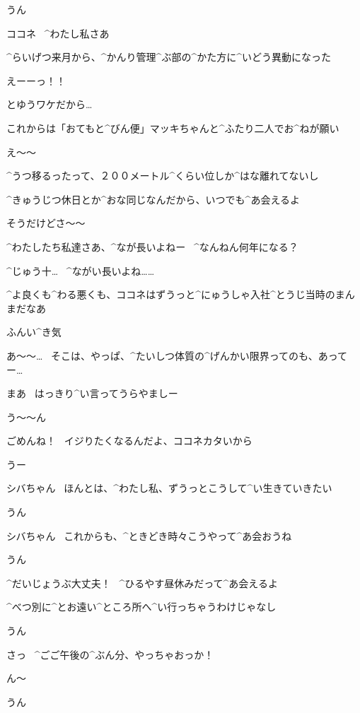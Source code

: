\Kokone うん

\page[79]
\Shiba ココネ
\ ^{わたし}{私}さあ

\Shiba ^{らいげつ}{来月}から、^{かんり}{管理}^{ぶ}{部}の^{かた}{方}に^{いどう}{異動}になった

\Kokone えーーっ！！

\Shiba とゆうワケだから…

\Shiba これからは「おてもと^{びん}{便}」マッキちゃんと^{ふたり}{二人}でお^{ねが}{願}い

\Kokone え〜〜

\Shiba ^{うつ}{移}るったって、２００メートル^{くらい}{位}しか^{はな}{離}れてないし

\Shiba ^{きゅうじつ}{休日}とか^{おな}{同}じなんだから、いつでも^{あ}{会}えるよ

\Kokone そうだけどさ〜〜

\page[80]
\Shiba ^{わたしたち}{私達}さあ、^{なが}{長}いよねー
\ ^{なんねん}{何年}になる？

\Kokone ^{じゅう}{十}…
\ ^{ながい}{長い}よね……

\page[81]
\Shiba ^{よ}{良}くも^{わる}{悪}くも、ココネはずうっと^{にゅうしゃ}{入社}^{とうじ}{当時}のまんまだなあ

\Shiba ふんい^{き}{気}

\Kokone あ〜〜…
\ そこは、やっぱ、^{たいしつ}{体質}の^{げんかい}{限界}ってのも、あってー…

\Shiba まあ
\ はっきり^{い}{言}ってうらやましー

\Kokone う〜〜ん

\page[82]
\Shiba ごめんね！
\ イジりたくなるんだよ、ココネカタいから

\Kokone うー

\page[83]
\Kokone シバちゃん
\ ほんとは、^{わたし}{私}、ずうっとこうして^{い}{生}きていきたい

\Shiba うん

\page[84]
\Kokone シバちゃん
\ これからも、^{ときどき}{時々}こうやって^{あ}{会}おうね

\Shiba うん

\Shiba ^{だいじょうぶ}{大丈夫}！
\ ^{ひるやす}{昼休}みだって^{あ}{会}えるよ

\Shiba ^{べつ}{別}に^{とお}{遠}い^{ところ}{所}へ^{い}{行}っちゃうわけじゃなし

\Kokone うん

\page[86]
\Shiba さっ
\ ^{ごご}{午後}の^{ぶん}{分}、やっちゃおっか！

\Shiba ん〜

\Kokone うん


